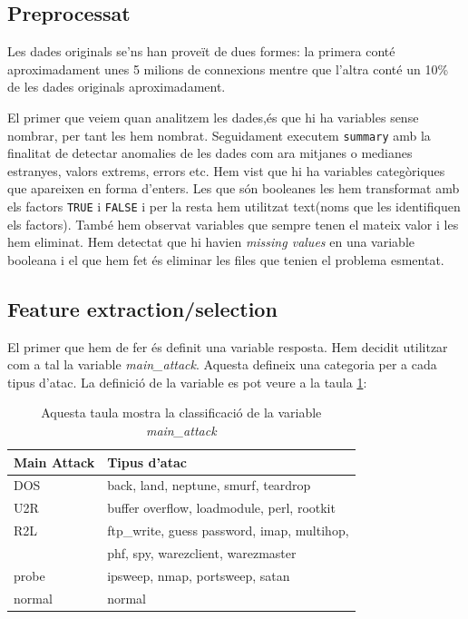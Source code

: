 \documentclass[a4paper]{article} %
\begin{document}
\subsection{Preprocessat}

Les dades originals se'ns han proveït de dues formes: la primera conté aproximadament unes 5 milions de connexions mentre que l'altra conté un 10\% de les dades originals aproximadament.

El primer que veiem quan analitzem les dades,és que hi ha variables sense nombrar, per tant les hem nombrat. Seguidament executem \lstinline|summary| amb la finalitat de detectar anomalies de les dades com ara mitjanes o medianes estranyes, valors extrems, errors etc. Hem vist que hi ha variables categòriques que apareixen en forma d'enters. Les que són booleanes les hem transformat amb els factors \lstinline|TRUE| i \lstinline|FALSE| i per la resta hem utilitzat text(noms que les identifiquen els factors). També hem observat variables que sempre tenen el mateix valor i les hem eliminat. Hem detectat que hi havien \textit{missing values} en una variable booleana i el que hem fet és eliminar les files que tenien el problema esmentat.


\subsection{Feature extraction/selection}

El primer que hem de fer és definit una variable resposta. Hem decidit utilitzar com a tal la variable \textit{main\_attack}.
Aquesta defineix una categoria per a cada tipus d'atac. La definició de la variable es pot veure a la taula \ref{table:main}:

\begin{table}
	\begin{tabular}{ll}
		Main Attack & Tipus d'atac                                                            \\ \hline
		DOS         & back, land, neptune, smurf, teardrop                                       \\
		U2R         & buffer overflow, loadmodule, perl, rootkit                               \\
		R2L         & ftp\_write, guess password, imap, multihop,\\ & phf, spy, warezclient, warezmaster \\
		probe       & ipsweep, nmap, portsweep, satan                                           \\
		normal      & normal                                                                 \\
	\end{tabular}
	\caption{Aquesta taula mostra la classificació de la variable \textit{main\_attack}}
	\label{table:main}
	
\end{table}
\end{document}
